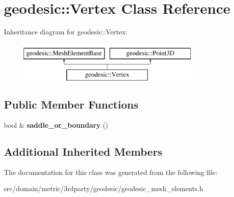 \hypertarget{classgeodesic_1_1_vertex}{}\section{geodesic\+:\+:Vertex Class Reference}
\label{classgeodesic_1_1_vertex}
Inheritance diagram for geodesic\+:\+:Vertex\+:\begin{figure}[H]
\begin{center}
\leavevmode
\includegraphics[height=2.000000cm]{classgeodesic_1_1_vertex}
\end{center}
\end{figure}
\subsection*{Public Member Functions}
\begin{DoxyCompactItemize}
\item 
\hypertarget{classgeodesic_1_1_vertex_a0feab1c26e1fecedcd1b08990260c10a}{}bool \& {\bfseries saddle\+\_\+or\+\_\+boundary} ()\label{classgeodesic_1_1_vertex_a0feab1c26e1fecedcd1b08990260c10a}

\end{DoxyCompactItemize}
\subsection*{Additional Inherited Members}


The documentation for this class was generated from the following file\+:\begin{DoxyCompactItemize}
\item 
src/domain/metric/3rdparty/geodesic/geodesic\+\_\+mesh\+\_\+elements.\+h\end{DoxyCompactItemize}

